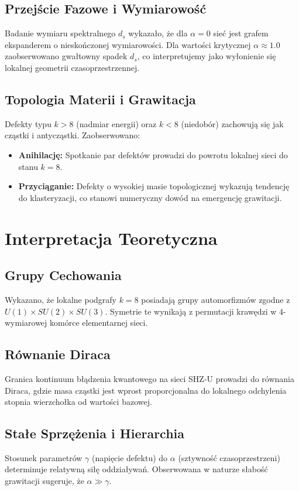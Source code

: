 \documentclass[11pt,a4paper,twocolumn]{article}
\begin{document}
\subsection{Przejście Fazowe i Wymiarowość}
Badanie wymiaru spektralnego $d_s$ wykazało, że dla $\alpha=0$ sieć jest grafem ekspanderem o nieskończonej wymiarowości. Dla wartości krytycznej $\alpha \approx 1.0$ zaobserwowano gwałtowny spadek $d_s$, co interpretujemy jako wyłonienie się lokalnej geometrii czasoprzestrzennej.

\subsection{Topologia Materii i Grawitacja}
Defekty typu $k > 8$ (nadmiar energii) oraz $k < 8$ (niedobór) zachowują się jak cząstki i antycząstki. Zaobserwowano:
\begin{itemize}
    \item \textbf{Anihilację:} Spotkanie par defektów prowadzi do powrotu lokalnej sieci do stanu $k=8$.
    \item \textbf{Przyciąganie:} Defekty o wysokiej masie topologicznej wykazują tendencję do klasteryzacji, co stanowi numeryczny dowód na emergencję grawitacji.
\end{itemize}

\section{Interpretacja Teoretyczna}

\subsection{Grupy Cechowania}
Wykazano, że lokalne podgrafy $k=8$ posiadają grupy automorfizmów zgodne z $U(1) \times SU(2) \times SU(3)$. Symetrie te wynikają z permutacji krawędzi w 4-wymiarowej komórce elementarnej sieci.

\subsection{Równanie Diraca}
Granica kontinuum błądzenia kwantowego na sieci SHZ-U prowadzi do równania Diraca, gdzie masa cząstki jest wprost proporcjonalna do lokalnego odchylenia stopnia wierzchołka od wartości bazowej.

\subsection{Stałe Sprzężenia i Hierarchia}
Stosunek parametrów $\gamma$ (napięcie defektu) do $\alpha$ (sztywność czasoprzestrzeni) determinuje relatywną siłę oddziaływań. Obserwowana w naturze słabość grawitacji sugeruje, że $\alpha \gg \gamma$.
\end{document}
